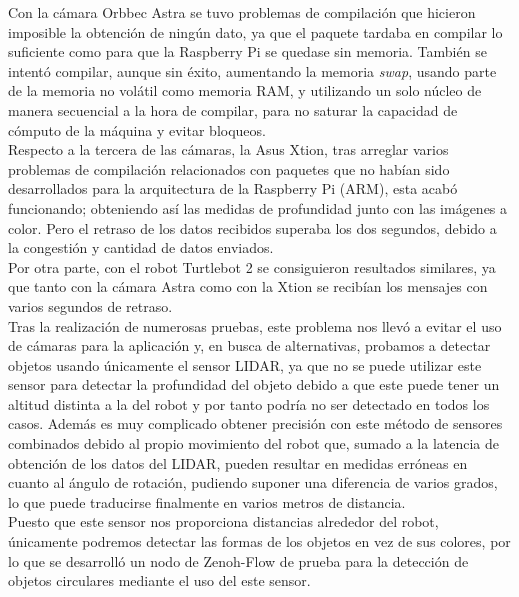 Con la cámara Orbbec Astra se tuvo problemas de compilación que hicieron
imposible la obtención de ningún dato, ya que el paquete tardaba en compilar lo
suficiente como para que la Raspberry Pi se quedase sin memoria.
También se intentó compilar, aunque sin éxito, aumentando la memoria
\textit{swap}, usando parte de la memoria no volátil como memoria RAM, y
utilizando un solo núcleo de manera secuencial a la hora de compilar, para no
saturar la capacidad de cómputo de la máquina y evitar bloqueos.
\\

Respecto a la tercera de las cámaras, la Asus Xtion, tras arreglar varios
problemas de compilación relacionados con paquetes que no habían sido
desarrollados para la arquitectura de la Raspberry Pi (ARM), esta acabó
funcionando; obteniendo así las medidas de profundidad junto con las imágenes a
color.
Pero el retraso de los datos recibidos superaba los dos segundos, debido a la
congestión y cantidad de datos enviados.
\\

Por otra parte, con el robot Turtlebot 2 se consiguieron resultados similares,
ya que tanto con la cámara Astra como con la Xtion se recibían los mensajes con
varios segundos de retraso.
\\

Tras la realización de numerosas pruebas, este problema nos llevó a evitar el
uso de cámaras para la aplicación y, en busca de alternativas, probamos a
detectar objetos usando únicamente el sensor LIDAR, ya que no se puede utilizar
este sensor para detectar la profundidad del objeto debido a que este puede
tener un altitud distinta a la del robot y por tanto podría no ser detectado en
todos los casos.
Además es muy complicado obtener precisión con este método de sensores
combinados debido al propio movimiento del robot que, sumado a la latencia de
obtención de los datos del LIDAR, pueden resultar en medidas erróneas en cuanto
al ángulo de rotación, pudiendo suponer una diferencia de varios grados, lo que
puede traducirse finalmente en varios metros de distancia.
\\

Puesto que este sensor nos proporciona distancias alrededor del robot,
únicamente podremos detectar las formas de los objetos en vez de sus colores,
por lo que se desarrolló un nodo de Zenoh-Flow de prueba para la detección de
objetos circulares mediante el uso del este sensor.
\\

